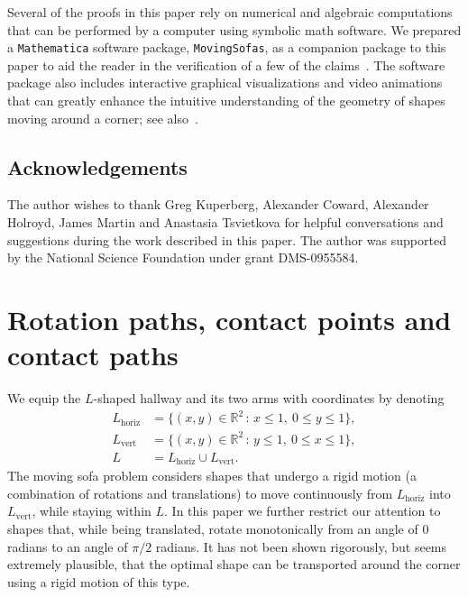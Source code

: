 \documentclass[11pt]{article}
\newcommand{\armh}{L_{\textrm{horiz}}}
\newcommand{\armv}{L_{\textrm{vert}}}
\newcommand{\hallway}{L}
\newcommand{\R}{\mathbb{R}}
\begin{document}
Several of the proofs in this paper rely on numerical and algebraic computations that can be performed by a computer using symbolic math software. We prepared a \texttt{Mathematica} software package, \texttt{MovingSofas}, as a companion package to this paper to aid the reader in the verification of a few of the claims~\cite{romik-sofa-mathematica}. The software package also includes interactive graphical visualizations and video animations that can greatly enhance the intuitive understanding of the geometry of shapes moving around a corner; see also~\cite{romik-sofa-web}. 

\subsection*{Acknowledgements}

The author wishes to thank Greg Kuperberg, Alexander Coward, Alexander Holroyd, James Martin and Anastasia Tsvietkova for helpful conversations and suggestions during the work described in this paper. The author was supported by the National Science Foundation under grant DMS-0955584.



\section{Rotation paths, contact points and contact paths}

\label{sec:rotation-paths}

We equip the $L$-shaped hallway and its two arms with coordinates by denoting
\begin{align*}
\armh &= \{(x,y)\in\R^2\,:\, x\le 1,\ 0\le y\le 1 \}, \\
\armv &= \{(x,y)\in\R^2\,:\, y\le 1,\ 0\le x\le 1 \}, \\
\hallway &= \armh\cup\armv.
\end{align*}
The moving sofa problem considers shapes that undergo a rigid motion (a combination of rotations and translations) to move continuously from $\armh$ into $\armv$, while staying within $\hallway$. In this paper we further restrict our attention to shapes that, while being translated, rotate monotonically from an angle of $0$ radians to an angle of $\pi/2$ radians. 
It has not been shown rigorously, but seems extremely plausible, that the optimal shape can be transported around the corner using a rigid motion of this type.
\end{document}
